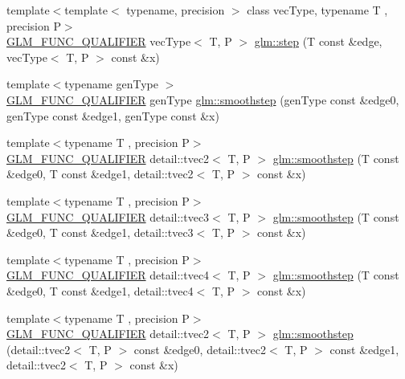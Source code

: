 \begin{DoxyCompactItemize}
\item 
{\footnotesize template$<$template$<$ typename, precision $>$ class vec\+Type, typename T , precision P$>$ }\\\hyperlink{setup_8hpp_a33fdea6f91c5f834105f7415e2a64407}{G\+L\+M\+\_\+\+F\+U\+N\+C\+\_\+\+Q\+U\+A\+L\+I\+F\+I\+ER} vec\+Type$<$ T, P $>$ \hyperlink{group__core__func__common_gae830a682901c0ba63c92a7d201bba007}{glm\+::step} (T const \&edge, vec\+Type$<$ T, P $>$ const \&x)
\item 
{\footnotesize template$<$typename gen\+Type $>$ }\\\hyperlink{setup_8hpp_a33fdea6f91c5f834105f7415e2a64407}{G\+L\+M\+\_\+\+F\+U\+N\+C\+\_\+\+Q\+U\+A\+L\+I\+F\+I\+ER} gen\+Type \hyperlink{group__core__func__common_ga754103c8d2cdaf40f71429252457c10a}{glm\+::smoothstep} (gen\+Type const \&edge0, gen\+Type const \&edge1, gen\+Type const \&x)
\item 
{\footnotesize template$<$typename T , precision P$>$ }\\\hyperlink{setup_8hpp_a33fdea6f91c5f834105f7415e2a64407}{G\+L\+M\+\_\+\+F\+U\+N\+C\+\_\+\+Q\+U\+A\+L\+I\+F\+I\+ER} detail\+::tvec2$<$ T, P $>$ \hyperlink{namespaceglm_a87db22e4254b9f56eaafefb7cfb72a13}{glm\+::smoothstep} (T const \&edge0, T const \&edge1, detail\+::tvec2$<$ T, P $>$ const \&x)
\item 
{\footnotesize template$<$typename T , precision P$>$ }\\\hyperlink{setup_8hpp_a33fdea6f91c5f834105f7415e2a64407}{G\+L\+M\+\_\+\+F\+U\+N\+C\+\_\+\+Q\+U\+A\+L\+I\+F\+I\+ER} detail\+::tvec3$<$ T, P $>$ \hyperlink{namespaceglm_a70ce610b837517f7cf8a82316b2b662c}{glm\+::smoothstep} (T const \&edge0, T const \&edge1, detail\+::tvec3$<$ T, P $>$ const \&x)
\item 
{\footnotesize template$<$typename T , precision P$>$ }\\\hyperlink{setup_8hpp_a33fdea6f91c5f834105f7415e2a64407}{G\+L\+M\+\_\+\+F\+U\+N\+C\+\_\+\+Q\+U\+A\+L\+I\+F\+I\+ER} detail\+::tvec4$<$ T, P $>$ \hyperlink{namespaceglm_ab64e62cbb8d64da4f3fc8a2abaff1684}{glm\+::smoothstep} (T const \&edge0, T const \&edge1, detail\+::tvec4$<$ T, P $>$ const \&x)
\item 
{\footnotesize template$<$typename T , precision P$>$ }\\\hyperlink{setup_8hpp_a33fdea6f91c5f834105f7415e2a64407}{G\+L\+M\+\_\+\+F\+U\+N\+C\+\_\+\+Q\+U\+A\+L\+I\+F\+I\+ER} detail\+::tvec2$<$ T, P $>$ \hyperlink{namespaceglm_a5eaf205dc0b9126303cbb1c7593b4665}{glm\+::smoothstep} (detail\+::tvec2$<$ T, P $>$ const \&edge0, detail\+::tvec2$<$ T, P $>$ const \&edge1, detail\+::tvec2$<$ T, P $>$ const \&x)

\end{DoxyCompactItemize}
